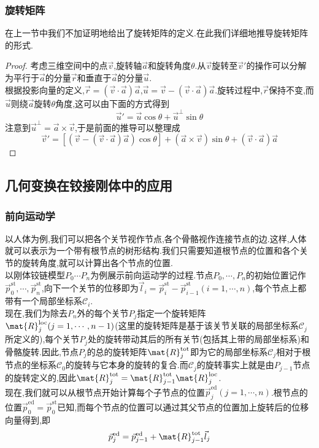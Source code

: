 \documentclass{ctexart}
\begin{document}
\subsubsection{旋转矩阵}
在上一节中我们不加证明地给出了旋转矩阵的定义.在此我们详细地推导旋转矩阵的形式.
\begin{proof}
    考虑三维空间中的点$\vec{v}$,旋转轴$\vec{a}$和旋转角度$\theta$.从$\vec{v}$旋转至$\vec{v}'$的操作可以分解为平行于$\vec{a}$的分量$\vec{r}$和垂直于$\vec{a}$的分量$\vec{u}$.\\
    根据投影向量的定义,$\vec{r}=(\vec{v}\cdot\vec{a})\vec{a}$,$\vec{u}=\vec{v}-(\vec{v}\cdot\vec{a})\vec{a}$.旋转过程中,$\vec{r}$保持不变,而$\vec{u}$则绕$\vec{a}$旋转$\theta$角度,这可以由下面的方式得到
    \[\vec{u}'=\vec{u}\cos\theta+\vec{u}^{\bot}\sin\theta\]
    注意到$\vec{u}^\bot=\vec{a}\times\vec{v}$,于是前面的推导可以整理成
    \[\vec{v}'=\left[\left(\vec{v}-(\vec{v}\cdot\vec{a})\vec{a}\right)\cos\theta\right]+(\vec{a}\times\vec{v})\sin\theta+(\vec{v}\cdot\vec{a})\vec{a}\]
\end{proof}
\subsection{几何变换在铰接刚体中的应用}
\subsubsection{前向运动学}
以人体为例,我们可以把各个关节视作节点,各个骨骼视作连接节点的边.这样,人体就可以表示为一个带有根节点的树形结构.我们只需要知道根节点的位置和各个关节的旋转角度,就可以计算出各个节点的位置.\\
\indent 以刚体铰链模型$P_0\cdots P_n$为例展示前向运动学的过程.节点$P_0,\cdots,P_n$的初始位置记作$\vec{p}_0^{\text{st}},\cdots,\vec{p}_n^{\text{st}}$,向下一个关节的位移即为$\vec{l}_i=\vec{p}_i^{\text{st}}-\vec{p}_{i-1}^{\text{st}}(i=1,\cdots,n)$,每个节点上都带有一个局部坐标系$\mathcal{C}_i$.\\
\indent 现在,我们为除去$P_n$外的每个关节$P_j$指定一个旋转矩阵$\mat{R}_j^{\text{loc}}(j=1,\cdots,n-1)$(这里的旋转矩阵是基于该关节关联的局部坐标系$\mathcal{C}_j$所定义的),每个关节$P_j$处的旋转带动其后的所有关节(包括其上带的局部坐标系)和骨骼旋转.因此,节点$P_j$的总的旋转矩阵$\mat{R}_{j}^{\text{tot}}$即为它的局部坐标系$\mathcal{C}_j$相对于根节点的坐标系$\mathcal{C}_0$的旋转与它本身的旋转的复合.而$\mathcal{C}_j$的旋转事实上就是由$P_{j-1}$节点的旋转定义的,因此$\mat{R}_{j}^{\text{tot}}=\mat{R}_{j-1}^{\text{tot}}\mat{R}_j^{\text{loc}}$.\\
\indent 现在,我们就可以从根节点开始计算每个子节点的位置$\vec{p}_j^{\text{ed}}(j=1,\cdots,n)$.根节点的位置$\vec{p}_0^{\text{ed}}=\vec{p}_0^{\text{st}}$已知,而每个节点的位置可以通过其父节点的位置加上旋转后的位移向量得到,即
\[\vec{p}_j^{\text{ed}}=\vec{p}_{j-1}^{\text{ed}}+\mat{R}_{j-1}^{\text{tot}}\vec{l}_j\]
\end{document}

